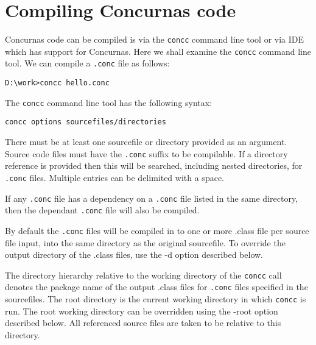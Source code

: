 \documentclass[conc-doc]{subfiles}
\begin{document}
	\chapter[Compiling Concurnas code]{Compiling Concurnas code}
	\label{ch:concc}
	

Concurnas code can be compiled is via the \lstinline[language=None]{concc} command line tool or via IDE which has support for Concurnas. Here we shall examine the \lstinline[language=None]{concc} command line tool. We can compile a \lstinline[language=None]{.conc} file as follows:

\begin{lstlisting}[language=None]
D:\work>concc hello.conc
\end{lstlisting}

The \lstinline[language=None]{concc} command line tool has the following syntax:

\begin{center}
\lstinline[language=None]{concc options sourcefiles/directories}
\end{center}

There must be at least one sourcefile or directory provided as an argument. Source code files must have the \lstinline[language=None]{.conc} suffix to be compilable. If a directory reference is provided then this will be searched, including nested directories, for \lstinline[language=None]{.conc} files. Multiple entries can be delimited with a space.

If any \lstinline[language=None]{.conc} file has a dependency on a \lstinline[language=None]{.conc} file listed in the same directory, then the dependant \lstinline[language=None]{.conc} file will also be compiled.

By default the \lstinline[language=None]{.conc} files will be compiled in to one or more .class file per source file input, into the same directory as the original sourcefile. To override the output directory of the .class files, use the -d option described below.

The directory hierarchy relative to the working directory of the \lstinline[language=None]{concc} call denotes the package name of the output .class files for \lstinline[language=None]{.conc} files specified in the sourcefiles. The root directory is the current working directory in which \lstinline[language=None]{concc} is run. The root working directory can be overridden using the -root option described below. All referenced source files are taken to be relative to this directory.
\end{document}
